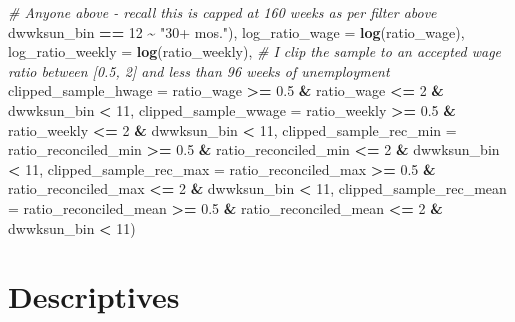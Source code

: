 \documentclass[
]{article}
\newenvironment{Shaded}{\begin{snugshade}}{\end{snugshade}}
\newcommand{\AttributeTok}[1]{\textcolor[rgb]{0.13,0.29,0.53}{#1}}
\newcommand{\CommentTok}[1]{\textcolor[rgb]{0.56,0.35,0.01}{\textit{#1}}}
\newcommand{\DecValTok}[1]{\textcolor[rgb]{0.00,0.00,0.81}{#1}}
\newcommand{\FloatTok}[1]{\textcolor[rgb]{0.00,0.00,0.81}{#1}}
\newcommand{\FunctionTok}[1]{\textcolor[rgb]{0.13,0.29,0.53}{\textbf{#1}}}
\newcommand{\NormalTok}[1]{#1}
\newcommand{\SpecialCharTok}[1]{\textcolor[rgb]{0.81,0.36,0.00}{\textbf{#1}}}
\newcommand{\StringTok}[1]{\textcolor[rgb]{0.31,0.60,0.02}{#1}}
\begin{document}
\begin{Shaded}
\begin{Highlighting}[]
                                 \CommentTok{\# Anyone above {-} recall this is capped at 160 weeks as per filter above}
\NormalTok{                                 dwwksun\_bin }\SpecialCharTok{==} \DecValTok{12} \SpecialCharTok{\textasciitilde{}} \StringTok{"30+ mos."}\NormalTok{),}
         \AttributeTok{log\_ratio\_wage =} \FunctionTok{log}\NormalTok{(ratio\_wage),}
         \AttributeTok{log\_ratio\_weekly =} \FunctionTok{log}\NormalTok{(ratio\_weekly),}
         \CommentTok{\# I clip the sample to an accepted wage ratio between [0.5, 2] and less than 96 weeks of unemployment}
         \AttributeTok{clipped\_sample\_hwage =}\NormalTok{ ratio\_wage }\SpecialCharTok{\textgreater{}=} \FloatTok{0.5} \SpecialCharTok{\&}\NormalTok{ ratio\_wage }\SpecialCharTok{\textless{}=} \DecValTok{2} \SpecialCharTok{\&}\NormalTok{ dwwksun\_bin }\SpecialCharTok{\textless{}} \DecValTok{11}\NormalTok{,}
         \AttributeTok{clipped\_sample\_wwage =}\NormalTok{ ratio\_weekly }\SpecialCharTok{\textgreater{}=} \FloatTok{0.5} \SpecialCharTok{\&}\NormalTok{ ratio\_weekly }\SpecialCharTok{\textless{}=} \DecValTok{2}  \SpecialCharTok{\&}\NormalTok{ dwwksun\_bin }\SpecialCharTok{\textless{}} \DecValTok{11}\NormalTok{,}
         \AttributeTok{clipped\_sample\_rec\_min =}\NormalTok{ ratio\_reconciled\_min }\SpecialCharTok{\textgreater{}=} \FloatTok{0.5} \SpecialCharTok{\&}\NormalTok{ ratio\_reconciled\_min }\SpecialCharTok{\textless{}=} \DecValTok{2} \SpecialCharTok{\&}\NormalTok{ dwwksun\_bin }\SpecialCharTok{\textless{}} \DecValTok{11}\NormalTok{,}
         \AttributeTok{clipped\_sample\_rec\_max =}\NormalTok{ ratio\_reconciled\_max }\SpecialCharTok{\textgreater{}=} \FloatTok{0.5} \SpecialCharTok{\&}\NormalTok{ ratio\_reconciled\_max }\SpecialCharTok{\textless{}=} \DecValTok{2} \SpecialCharTok{\&}\NormalTok{ dwwksun\_bin }\SpecialCharTok{\textless{}} \DecValTok{11}\NormalTok{,}
         \AttributeTok{clipped\_sample\_rec\_mean =}\NormalTok{ ratio\_reconciled\_mean }\SpecialCharTok{\textgreater{}=} \FloatTok{0.5} \SpecialCharTok{\&}\NormalTok{ ratio\_reconciled\_mean }\SpecialCharTok{\textless{}=} \DecValTok{2} \SpecialCharTok{\&}\NormalTok{ dwwksun\_bin }\SpecialCharTok{\textless{}} \DecValTok{11}\NormalTok{)}
\end{Highlighting}
\end{Shaded}

\section{Descriptives}\label{descriptives}
\end{document}
